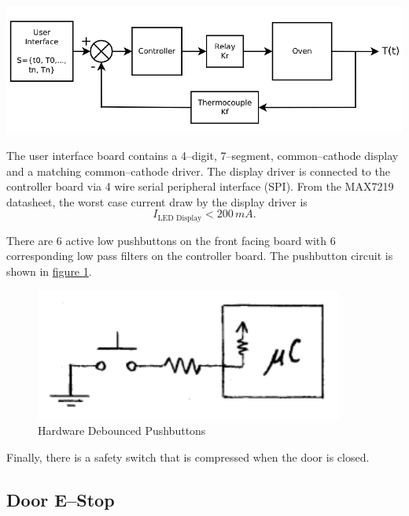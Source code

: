 \documentclass[10pt, twocolumn]{article}
\begin{document}
\begin{center}
	\includegraphics[width=\columnwidth]{Figures/control-system.pdf}
\end{center}

The user interface board contains a 4--digit, 7--segment, common--cathode
display and a matching common--cathode driver. The display driver
is connected to the controller board via 4 wire serial peripheral interface (SPI).
From the MAX7219 datasheet, the worst case current draw by the display driver
is
\begin{equation}
I_{\textrm{LED Display}}<200\,mA.
\end{equation}

There are 6 active low
pushbuttons on the front facing board with 6 corresponding low pass filters
on the controller board. The pushbutton circuit is shown in
\hyperref[pushbutton-circuit]{figure \ref{pushbutton-circuit}}.

\begin{figure}
	\centering
	\includegraphics[width=0.8\columnwidth]{Figures/pushbutton-circuit.pdf}
	\caption{Hardware Debounced Pushbuttons}
	\label{pushbutton-circuit}
\end{figure}

Finally, there is a safety switch that is compressed when the door is closed.

\subsection{Door E--Stop}
\end{document}
